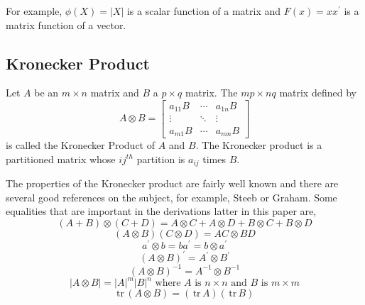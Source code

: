 \documentclass[12pt,thmsa,suthesis,verbatim]{report}
\begin{document}
For example, $\phi \left( X\right) =\left| X\right| $ is a scalar function
of a matrix and $F\left( x\right) =xx^{\prime }$ is a matrix function of a
vector.

\subsection{Kronecker Product}

Let $A$ be an $m\times n$ matrix and $B$ a $p\times q$ matrix. The $mp\times
nq$ matrix defined by 
\begin{equation}
A\otimes B=\left[ 
\begin{array}{ccc}
a_{11}B & \cdots & a_{1n}B \\ 
\vdots & \ddots & \vdots \\ 
a_{m1}B & \cdots & a_{mn}B
\end{array}
\right]
\end{equation}
is called the Kronecker Product of $A$ and $B$. The Kronecker product is a
partitioned matrix whose $ij^{th}$ partition is $a_{ij}$ times $B$.

The properties of the Kronecker product are fairly well known and there are
several good references on the subject, for example, Steeb\cite{Steeb91} or
Graham\cite{Graham81}. Some equalities that are important in the derivations
latter in this paper are, 
\begin{equation}
\left( A+B\right) \otimes \left( C+D\right) =A\otimes C+A\otimes D+B\otimes
C+B\otimes D
\end{equation}
\begin{equation}
\left( A\otimes B\right) \left( C\otimes D\right) =AC\otimes BD
\end{equation}
\begin{equation}
a^{\prime }\otimes b=ba^{\prime }=b\otimes a^{\prime }
\end{equation}
\begin{equation}
\left( A\otimes B\right) ^{\prime }=A^{\prime }\otimes B^{\prime }
\end{equation}
\begin{equation}
\left( A\otimes B\right) ^{-1}=A^{-1}\otimes B^{-1}
\end{equation}
\begin{equation}
\left| A\otimes B\right| =\left| A\right| ^m\left| B\right| ^n\text{ where }A%
\text{ is }n\times n\text{ and }B\text{ is }m\times m  \label{krondet}
\end{equation}
\begin{equation}
\,\mathrm{tr}\,\left( A\otimes B\right) =\left( \,\mathrm{tr}\,A\right)
\left( \,\mathrm{tr}\,B\right)  \label{krontrace}
\end{equation}
\end{document}
